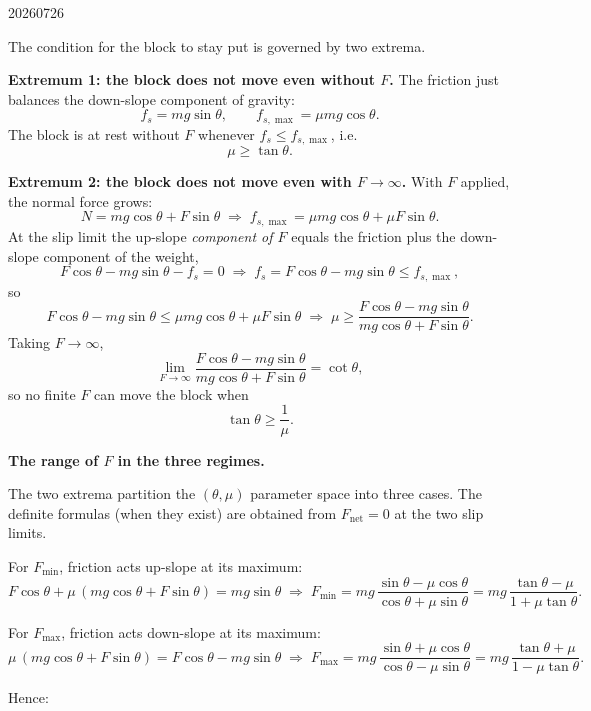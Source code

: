 \begin{solution}{20260726}

The condition for the block to stay put is governed by two extrema.

\medskip
\noindent\textbf{Extremum 1: the block does not move even without $F$.}
The friction just balances the down-slope component of gravity:
\[
  f_s = mg\sin\theta,
  \qquad
  f_{s,\max} = \mu mg\cos\theta .
\]
The block is at rest without $F$ whenever $f_s \le f_{s,\max}$, i.e.
\[
  \boxed{\mu \ge \tan\theta}.
\]

\medskip
\noindent\textbf{Extremum 2: the block does not move even with $F \to \infty$.}
With $F$ applied, the normal force grows:
\[
  N = mg\cos\theta + F\sin\theta
  \;\Longrightarrow\;
  f_{s,\max} = \mu mg\cos\theta + \mu F\sin\theta .
\]
At the slip limit the up-slope \emph{component of $F$} equals the friction plus the down-slope component of the weight,
\[
  F\cos\theta - mg\sin\theta - f_s = 0
  \;\Longrightarrow\;
  f_s = F\cos\theta - mg\sin\theta \le f_{s,\max},
\]
so
\[
  F\cos\theta - mg\sin\theta \le \mu mg\cos\theta + \mu F\sin\theta
  \;\Longrightarrow\;
  \mu \ge \frac{F\cos\theta - mg\sin\theta}{mg\cos\theta + F\sin\theta}.
\]
Taking $F \to \infty$,
\[
  \lim_{F\to\infty}\frac{F\cos\theta - mg\sin\theta}{mg\cos\theta + F\sin\theta}
  = \cot\theta,
\]
so no finite $F$ can move the block when
\[
  \boxed{\tan\theta \ge \frac{1}{\mu}}.
\]

\medskip
\noindent\textbf{The range of $F$ in the three regimes.}

The two extrema partition the $(\theta,\mu)$ parameter space into three cases.  The definite formulas (when they exist) are obtained from $F_{\text{net}} = 0$ at the two slip limits.

For $F_{\min}$, friction acts up-slope at its maximum:
\[
  F\cos\theta + \mu\,(mg\cos\theta + F\sin\theta) = mg\sin\theta
  \;\Longrightarrow\;
  \boxed{F_{\min} = mg\,\frac{\sin\theta - \mu\cos\theta}{\cos\theta + \mu\sin\theta}
  = mg\,\frac{\tan\theta - \mu}{1 + \mu\tan\theta}} .
\]

For $F_{\max}$, friction acts down-slope at its maximum:
\[
  \mu\,(mg\cos\theta + F\sin\theta) = F\cos\theta - mg\sin\theta
  \;\Longrightarrow\;
  \boxed{F_{\max} = mg\,\frac{\sin\theta + \mu\cos\theta}{\cos\theta - \mu\sin\theta}
  = mg\,\frac{\tan\theta + \mu}{1 - \mu\tan\theta}} .
\]

Hence:


\end{solution}
